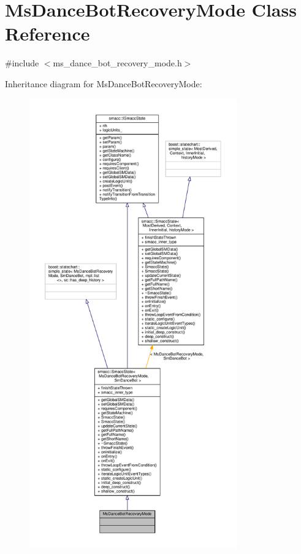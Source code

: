 \hypertarget{classMsDanceBotRecoveryMode}{}\section{Ms\+Dance\+Bot\+Recovery\+Mode Class Reference}
\label{classMsDanceBotRecoveryMode}


{\ttfamily \#include $<$ms\+\_\+dance\+\_\+bot\+\_\+recovery\+\_\+mode.\+h$>$}



Inheritance diagram for Ms\+Dance\+Bot\+Recovery\+Mode\+:
\nopagebreak
\begin{figure}[H]
\begin{center}
\leavevmode
\includegraphics[height=550pt]{classMsDanceBotRecoveryMode__inherit__graph}
\end{center}
\end{figure}



